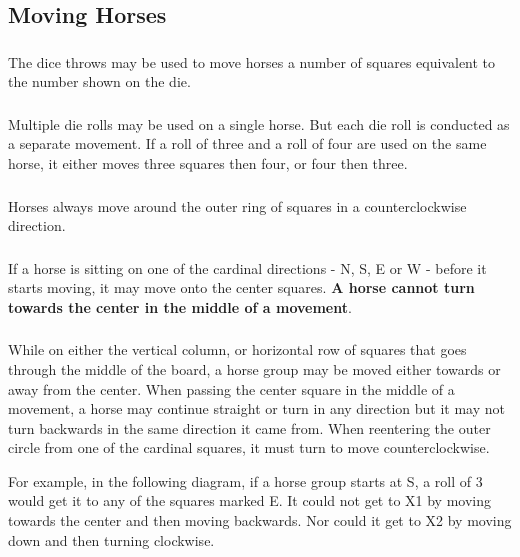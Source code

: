 \documentclass[12pt]{article} %
\begin{document}
\subsection{Moving Horses}

\subsubsection{}
The dice throws may be used to move horses a number of squares equivalent to the number shown on the die.  

\subsubsection{}
Multiple die rolls may be used on a single horse.  But each die roll is conducted as a separate movement.  If a roll of three and a roll of four are used on the same horse, it either moves three squares then four, or four then three.  

\subsubsection{}
 Horses always move around the outer ring of squares in a counterclockwise direction.

\subsubsection{}
If a horse is sitting on one of the cardinal directions - N, S, E or W - before it starts moving, it may move onto the center squares.  \textbf{A horse cannot turn towards the center in the middle of a movement}.

\subsubsection{}
While on either the vertical column, or horizontal row of squares that goes through the middle of the board, a horse group may be moved either towards or away from the center. When passing the center square in the middle of a movement, a horse may continue straight or turn in any direction but it may not turn backwards in the same direction it came from.  When reentering the outer circle from one of the cardinal squares, it must turn to move counterclockwise.\newline

\newpage

For example, in the following diagram, if a horse group starts at S, a roll of 3 would get it to any of the squares marked E.  It could not get to X1 by moving towards the center and then moving backwards.  Nor could it get to X2 by moving down and then turning clockwise.\newline
\end{document}
